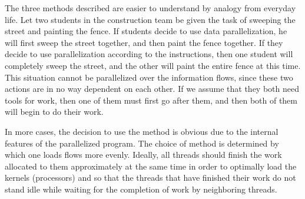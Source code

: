 {	\par The three methods described are easier to understand by analogy from everyday life. Let two students in the construction team be given the task of sweeping the street and painting the fence. If students decide to use data parallelization, he will first sweep the street together, and then paint the fence together. If they decide to use parallelization according to the instructions, then one student will completely sweep the street, and the other will paint the entire fence at this time. This situation cannot be parallelized over the information flows, since these two actions are in no way dependent on each other. If we assume that they both need tools for work, then one of them must first go after them, and then both of them will begin to do their work.
	\par In more cases, the decision to use the method is obvious due to the internal features of the parallelized program. The choice of method is determined by which one loads flows more evenly. Ideally, all threads should finish the work allocated to them approximately at the same time in order to optimally load the kernels (processors) and so that the threads that have finished their work do not stand idle while waiting for the completion of work by neighboring threads.
	\par
}